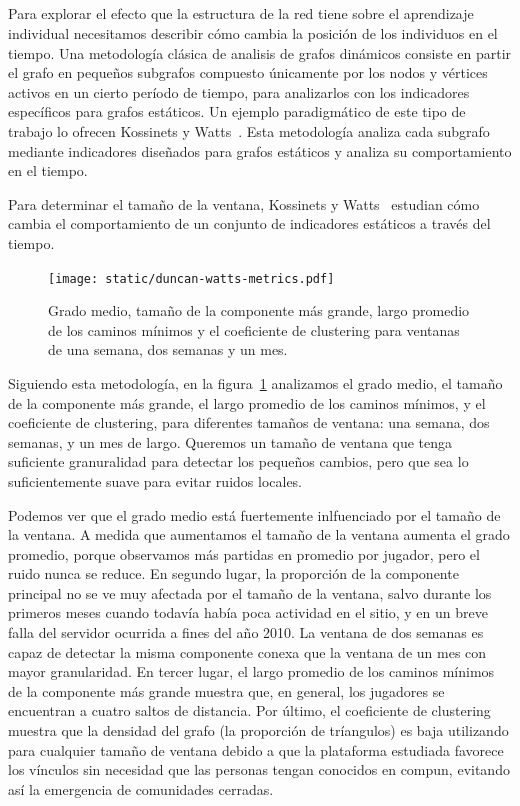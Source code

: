 \documentclass[a4paper,11pt]{book}
\theoremstyle{definition}
\newif\ifen
\newif\ifes
\newcommand{\En}[1]{\ifen#1\fi}
\newcommand{\Es}[1]{\ifes#1\fi}
\begin{document}
\subsection{\En{A classical dynamic graph analysis methodology}}
Para explorar el efecto que la estructura de la red tiene sobre el aprendizaje individual necesitamos describir cómo cambia la posición de los individuos en el tiempo.
%
Una metodología clásica de analisis de grafos dinámicos consiste en partir el grafo en pequeños subgrafos compuesto únicamente por los nodos y vértices activos en un cierto período de tiempo, para analizarlos con los indicadores específicos para grafos estáticos.
%
Un ejemplo paradigmático de este tipo de trabajo lo ofrecen Kossinets y Watts~\cite{Kossinets2006}.
%
Esta metodología analiza cada subgrafo mediante indicadores diseñados para grafos estáticos y analiza su comportamiento en el tiempo.

Para determinar el tamaño de la ventana, Kossinets y Watts~\cite{Kossinets2006} estudian cómo cambia el comportamiento de un conjunto de indicadores estáticos a través del tiempo.
%
\begin{figure}[ht!]
	\texttt{[image: static/duncan-watts-metrics.pdf]}
	\caption{
	Grado medio, tamaño de la componente más grande,  largo promedio de los caminos mínimos y el coeficiente de clustering para ventanas de una semana, dos semanas y un mes.
	}
	\label{Figuras.DW}
\end{figure}
%
Siguiendo esta metodología, en la figura~\ref{Figuras.DW} analizamos el grado medio, el tamaño de la componente más grande, el largo promedio de los caminos mínimos, y el coeficiente de clustering, para diferentes tamaños de ventana: una semana, dos semanas, y un mes de largo.
%
Queremos un tamaño de ventana que tenga suficiente granuralidad para detectar los pequeños cambios, pero que sea lo suficientemente suave para evitar ruidos locales.

Podemos ver que el grado medio está fuertemente inlfuenciado por el tamaño de la ventana.
%
A medida que aumentamos el tamaño de la ventana aumenta el grado promedio, porque observamos más partidas en promedio por jugador, pero el ruido nunca se reduce.
%
En segundo lugar, la proporción de la componente principal no se ve muy afectada por el tamaño de la ventana, salvo durante los primeros meses cuando todavía había poca actividad en el sitio, y en un breve falla del servidor ocurrida a fines del año 2010.
%
La ventana de dos semanas es capaz de detectar la misma componente conexa que la ventana de un mes con mayor granularidad.
%
En tercer lugar, el largo promedio de los caminos mínimos de la componente más grande muestra que, en general, los jugadores se encuentran a cuatro saltos de distancia.
%
Por último, el coeficiente de clustering muestra que la densidad del grafo (la proporción de tríangulos) es baja utilizando para cualquier tamaño de ventana debido a que la plataforma estudiada favorece los vínculos sin necesidad que las personas tengan conocidos en compun, evitando así la emergencia de comunidades cerradas.
\end{document}
